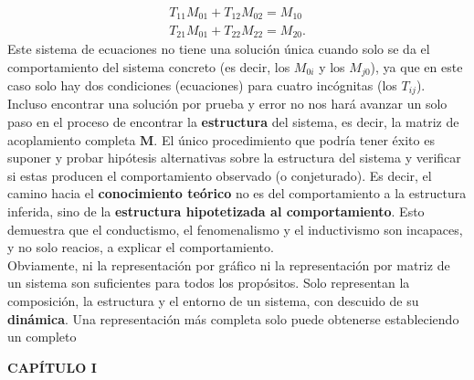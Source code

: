 {\begin{gather*}
T_{11}M_{01} + T_{12}M_{02} = M_{10} \\
T_{21}M_{01} + T_{22}M_{22} = M_{20} .
\end{gather*}
Este sistema de ecuaciones no tiene una solución única cuando solo se da el comportamiento del sistema concreto (es decir, los $M_{0i}$ y los $M_{j0}$), ya que en este caso solo hay dos condiciones (ecuaciones) para cuatro incógnitas (los $T_{ij}$). Incluso encontrar una solución por prueba y error no nos hará avanzar un solo paso en el proceso de encontrar la \textbf{estructura} del sistema, es decir, la matriz de acoplamiento completa $\mathbf{M}$. El único procedimiento que podría tener éxito es suponer y probar hipótesis alternativas sobre la estructura del sistema y verificar si estas producen el comportamiento observado (o conjeturado). Es decir, el camino hacia el \textbf{conocimiento teórico} no es del comportamiento a la estructura inferida, sino de la \textbf{estructura hipotetizada al comportamiento}. Esto demuestra que el conductismo, el fenomenalismo y el inductivismo son incapaces, y no solo reacios, a explicar el comportamiento.
\\

Obviamente, ni la representación por gráfico ni la representación por matriz de un sistema son suficientes para todos los propósitos. Solo representan la composición, la estructura y el entorno de un sistema, con descuido de su \textbf{dinámica}. Una representación más completa solo puede obtenerse estableciendo un completo
}

\newpage
\fancyhf{}
\fancyhead[l]{\thepage}
\begin{center}
{\fontsize{13}{16}\selectfont \textbf{CAPÍTULO I}}
\end{center}
\vspace{0.5cm}


